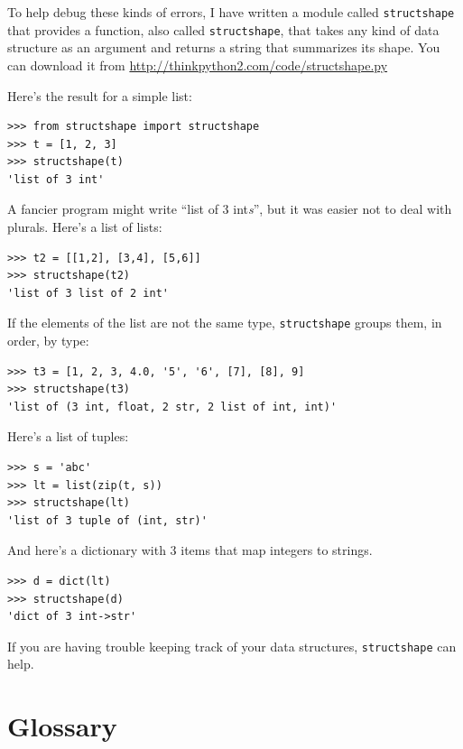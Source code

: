 \documentclass[10pt]{book}
\begin{document}
To help debug these kinds of errors, I have written a module
called {\tt structshape} that provides a function, also called
{\tt structshape}, that takes any kind of data structure as
an argument and returns a string that summarizes its shape.
You can download it from \url{http://thinkpython2.com/code/structshape.py}

Here's the result for a simple list:

\begin{verbatim}
>>> from structshape import structshape
>>> t = [1, 2, 3]
>>> structshape(t)
'list of 3 int'
\end{verbatim}
%
A fancier program might write ``list of 3 int{\em s}'', but it
was easier not to deal with plurals.  Here's a list of lists:

\begin{verbatim}
>>> t2 = [[1,2], [3,4], [5,6]]
>>> structshape(t2)
'list of 3 list of 2 int'
\end{verbatim}
%
If the elements of the list are not the same type,
{\tt structshape} groups them, in order, by type:

\begin{verbatim}
>>> t3 = [1, 2, 3, 4.0, '5', '6', [7], [8], 9]
>>> structshape(t3)
'list of (3 int, float, 2 str, 2 list of int, int)'
\end{verbatim}
%
Here's a list of tuples:

\begin{verbatim}
>>> s = 'abc'
>>> lt = list(zip(t, s))
>>> structshape(lt)
'list of 3 tuple of (int, str)'
\end{verbatim}
%
And here's a dictionary with 3 items that map integers to strings.

\begin{verbatim}
>>> d = dict(lt)
>>> structshape(d)
'dict of 3 int->str'
\end{verbatim}
%
If you are having trouble keeping track of your data structures,
{\tt structshape} can help.


\section{Glossary}
\end{document}
